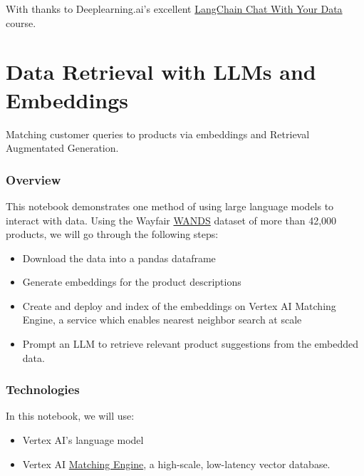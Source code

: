 \documentclass[
  letterpaper,
  DIV=11,
  numbers=noendperiod]{scrreprt}
\begin{document}
With thanks to Deeplearning.ai's excellent
\href{https://learn.deeplearning.ai/langchain-chat-with-your-data/lesson/1/introduction}{LangChain
Chat With Your Data} course.


\hypertarget{data-retrieval-with-llms-and-embeddings}{%
\chapter{Data Retrieval with LLMs and
Embeddings}\label{data-retrieval-with-llms-and-embeddings}}

Matching customer queries to products via embeddings and Retrieval
Augmentated Generation.

\hypertarget{overview}{%
\subsection{Overview}\label{overview}}

This notebook demonstrates one method of using large language models to
interact with data. Using the Wayfair
\href{https://www.aboutwayfair.com/careers/tech-blog/wayfair-releases-wands-the-largest-and-richest-publicly-available-dataset-for-e-commerce-product-search-relevance}{WANDS}
dataset of more than 42,000 products, we will go through the following
steps:

\begin{itemize}
\item
  Download the data into a pandas dataframe
\item
  Generate embeddings for the product descriptions
\item
  Create and deploy and index of the embeddings on Vertex AI Matching
  Engine, a service which enables nearest neighbor search at scale
\item
  Prompt an LLM to retrieve relevant product suggestions from the
  embedded data.
\end{itemize}

\hypertarget{technologies}{%
\subsection{Technologies}\label{technologies}}

In this notebook, we will use:

\begin{itemize}
\item
  Vertex AI's language model
\item
  Vertex AI
  \href{https://cloud.google.com/vertex-ai/docs/matching-engine/overview}{Matching
  Engine}, a high-scale, low-latency vector database.
\end{itemize}
\end{document}
